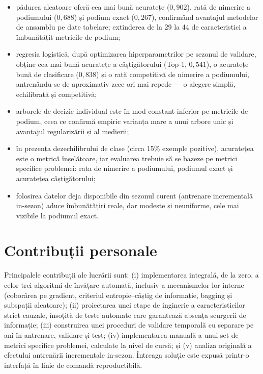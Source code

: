 \documentclass[12pt,a4paper]{report}
\begin{document}
\begin{itemize}
  \item pădurea aleatoare oferă cea mai bună acuratețe ($0{,}902$), rată de nimerire a podiumului
    ($0{,}688$) și podium exact ($0{,}267$), confirmând avantajul metodelor de ansamblu pe date
    tabelare; extinderea de la 29 la 44 de caracteristici a îmbunătățit metricile de podium;
  \item regresia logistică, după optimizarea hiperparametrilor pe sezonul de validare, obține cea
    mai bună acuratețe a câștigătorului (Top-1, $0{,}541$), o acuratețe bună de clasificare ($0{,}838$)
    și o rată competitivă de nimerire a podiumului, antrenându-se de aproximativ zece ori mai repede
    --- o alegere simplă, echilibrată și competitivă;
  \item arborele de decizie individual este în mod constant inferior pe metricile de podium, ceea ce
    confirmă empiric varianța mare a unui arbore unic și avantajul regularizării și al medierii;
  \item în prezența dezechilibrului de clase (circa 15\% exemple pozitive), acuratețea este o
    metrică înșelătoare, iar evaluarea trebuie să se bazeze pe metrici specifice problemei: rata de
    nimerire a podiumului, podiumul exact și acuratețea câștigătorului;
  \item folosirea datelor deja disponibile din sezonul curent (antrenare incrementală in-sezon)
    aduce îmbunătățiri reale, dar modeste și neuniforme, cele mai vizibile la podiumul exact.
\end{itemize}

\section{Contribuții personale}

Principalele contribuții ale lucrării sunt: (i) implementarea integrală, de la zero, a celor trei
algoritmi de învățare automată, inclusiv a mecanismelor lor interne (coborârea pe gradient,
criteriul entropie--câștig de informație, bagging și subspații aleatoare); (ii) proiectarea unei
etape de inginerie a caracteristicilor strict cauzale, însoțită de teste automate care garantează
absența scurgerii de informație; (iii) construirea unei proceduri de validare temporală cu separare
pe ani în antrenare, validare și test; (iv) implementarea manuală a unui set de metrici specifice
problemei, calculate la nivel de cursă; și (v) analiza originală a efectului antrenării incrementale
in-sezon. Întreaga soluție este expusă printr-o interfață în linie de comandă reproductibilă.
\end{document}

